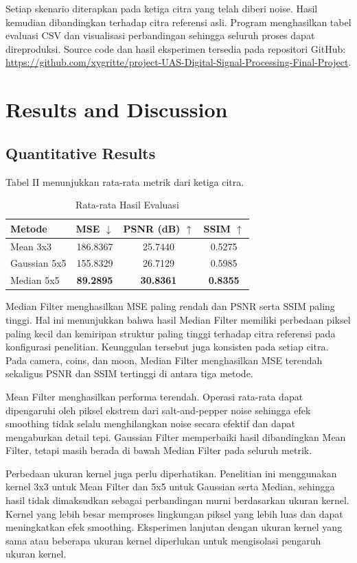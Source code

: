 \documentclass[conference,a4paper]{IEEEtran}
\begin{document}
Setiap skenario diterapkan pada ketiga citra yang telah diberi noise. Hasil kemudian dibandingkan terhadap citra referensi asli. Program menghasilkan tabel evaluasi CSV dan visualisasi perbandingan sehingga seluruh proses dapat direproduksi. Source code dan hasil eksperimen tersedia pada repositori GitHub: \url{https://github.com/xygritte/project-UAS-Digital-Signal-Processing-Final-Project}.

\section{Results and Discussion}
\subsection{Quantitative Results}
Tabel II menunjukkan rata-rata metrik dari ketiga citra.

\begin{table}[t]
\caption{Rata-rata Hasil Evaluasi}
\centering
\begin{tabular}{lccc}
\toprule
Metode & MSE $\downarrow$ & PSNR (dB) $\uparrow$ & SSIM $\uparrow$ \\
\midrule
Mean 3x3 & 186.8367 & 25.7440 & 0.5275 \\
Gaussian 5x5 & 155.8329 & 26.7129 & 0.5985 \\
Median 5x5 & \textbf{89.2895} & \textbf{30.8361} & \textbf{0.8355} \\
\bottomrule
\end{tabular}
\end{table}

Median Filter menghasilkan MSE paling rendah dan PSNR serta SSIM paling tinggi. Hal ini menunjukkan bahwa hasil Median Filter memiliki perbedaan piksel paling kecil dan kemiripan struktur paling tinggi terhadap citra referensi pada konfigurasi penelitian. Keunggulan tersebut juga konsisten pada setiap citra. Pada camera, coins, dan moon, Median Filter menghasilkan MSE terendah sekaligus PSNR dan SSIM tertinggi di antara tiga metode.

Mean Filter menghasilkan performa terendah. Operasi rata-rata dapat dipengaruhi oleh piksel ekstrem dari salt-and-pepper noise sehingga efek smoothing tidak selalu menghilangkan noise secara efektif dan dapat mengaburkan detail tepi. Gaussian Filter memperbaiki hasil dibandingkan Mean Filter, tetapi masih berada di bawah Median Filter pada seluruh metrik.

Perbedaan ukuran kernel juga perlu diperhatikan. Penelitian ini menggunakan kernel 3x3 untuk Mean Filter dan 5x5 untuk Gaussian serta Median, sehingga hasil tidak dimaksudkan sebagai perbandingan murni berdasarkan ukuran kernel. Kernel yang lebih besar memproses lingkungan piksel yang lebih luas dan dapat meningkatkan efek smoothing. Eksperimen lanjutan dengan ukuran kernel yang sama atau beberapa ukuran kernel diperlukan untuk mengisolasi pengaruh ukuran kernel.
\end{document}

